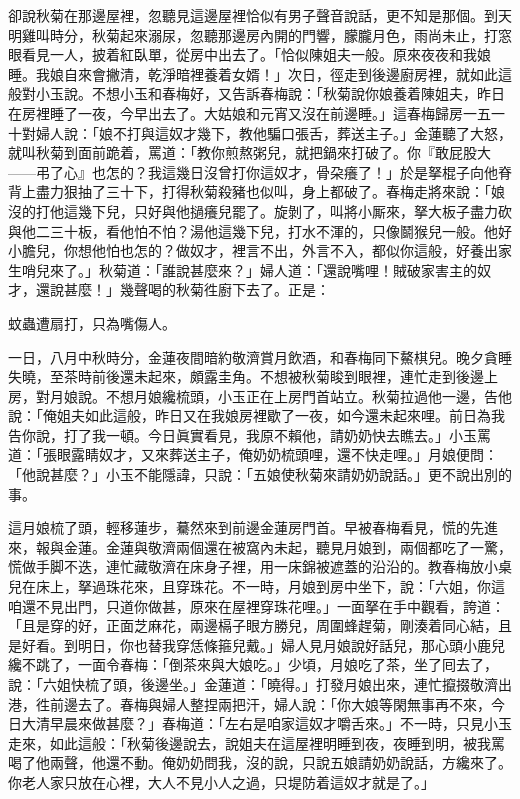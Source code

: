 卻說秋菊在那邊屋裡，忽聽見這邊屋裡恰似有男子聲音說話，更不知是那個。到天明雞叫時分，秋菊起來溺尿，忽聽那邊房內開的門響，朦朧月色，雨尚未止，打窓眼看見一人，披着紅臥單，從房中出去了。「恰似陳姐夫一般。{}原來夜夜和我娘睡。我娘自來會撇清，乾淨暗裡養着女婿！」次日，徑走到後邊廚房裡，就如此這般對小玉說。不想小玉和春梅好，又告訴春梅說：「秋菊說你娘養着陳姐夫，昨日在房裡睡了一夜，今早出去了。大姑娘和元宵又沒在前邊睡。」這春梅歸房一五一十對婦人說：「娘不打與這奴才幾下，教他騙口張舌，葬送主子。」金蓮聽了大怒，就叫秋菊到面前跪着，罵道：「教你煎熬粥兒，就把鍋來打破了。你『敢屁股大——弔了心』也怎的？我這幾日沒曾打你這奴才，骨朶癢了！」於是拏棍子向他脊背上盡力狠抽了三十下，打得秋菊殺豬也似叫，身上都破了。{}春梅走將來說：「娘沒的打他這幾下兒，只好與他撾癢兒罷了。旋剝了，叫將小厮來，拏大板子盡力砍與他二三十板，看他怕不怕？湯他這幾下兒，打水不渾的，只像鬬猴兒一般。他好小膽兒，你想他怕也怎的？做奴才，裡言不出，外言不入，都似你這般，好養出家生哨兒來了。」{}秋菊道：「誰說甚麼來？」婦人道：「還說嘴哩！賊破家害主的奴才，還說甚麼！」幾聲喝的秋菊徃廚下去了。正是：

\begin{myquote}
蚊蟲遭扇打，只為嘴傷人。
\end{myquote}

一日，八月中秋時分，金蓮夜間暗約敬濟賞月飲酒，和春梅同下鰲棋兒。晚夕貪睡失曉，至茶時前後還未起來，頗露圭角。不想被秋菊睃到眼裡，連忙走到後邊上房，對月娘說。不想月娘纔梳頭，小玉正在上房門首站立。秋菊拉過他一邊，告他說：「俺姐夫如此這般，昨日又在我娘房裡歇了一夜，如今還未起來哩。前日為我告你說，打了我一頓。今日眞實看見，我原不賴他，請奶奶快去瞧去。」小玉罵道：「張眼露睛奴才，又來葬送主子，俺奶奶梳頭哩，還不快走哩。」月娘便問：「他說甚麼？」小玉不能隱諱，只說：「五娘使秋菊來請奶奶說話。」更不說出別的事。

這月娘梳了頭，輕移蓮步，驀然來到前邊金蓮房門首。早被春梅看見，慌的先進來，報與金蓮。金蓮與敬濟兩個還在被窩內未起，聽見月娘到，兩個都吃了一驚，慌做手脚不迭，連忙藏敬濟在床身子裡，用一床錦被遮蓋的沿沿的。{}教春梅放小桌兒在床上，拏過珠花來，且穿珠花。不一時，月娘到房中坐下，說：「六姐，你這咱還不見出門，只道你做甚，原來在屋裡穿珠花哩。」一面拏在手中觀看，誇道：「且是穿的好，正面芝麻花，兩邊槅子眼方勝兒，周圍蜂趕菊，剛湊着同心結，且是好看。到明日，你也替我穿恁條箍兒戴。」婦人見月娘說好話兒，那心頭小鹿兒纔不跳了，一面令春梅：「倒茶來與大娘吃。」少頃，月娘吃了茶，坐了囘去了，說：「六姐快梳了頭，後邊坐。」金蓮道：「曉得。」打發月娘出來，連忙攛掇敬濟出港，徃前邊去了。春梅與婦人整捏兩把汗，婦人說：「你大娘等閑無事再不來，今日大清早晨來做甚麼？」春梅道：「左右是咱家這奴才嚼舌來。」不一時，只見小玉走來，如此這般：「秋菊後邊說去，說姐夫在這屋裡明睡到夜，夜睡到明，被我罵喝了他兩聲，他還不動。{}俺奶奶問我，沒的說，只說五娘請奶奶說話，方纔來了。你老人家只放在心裡，大人不見小人之過，只堤防着這奴才就是了。」

